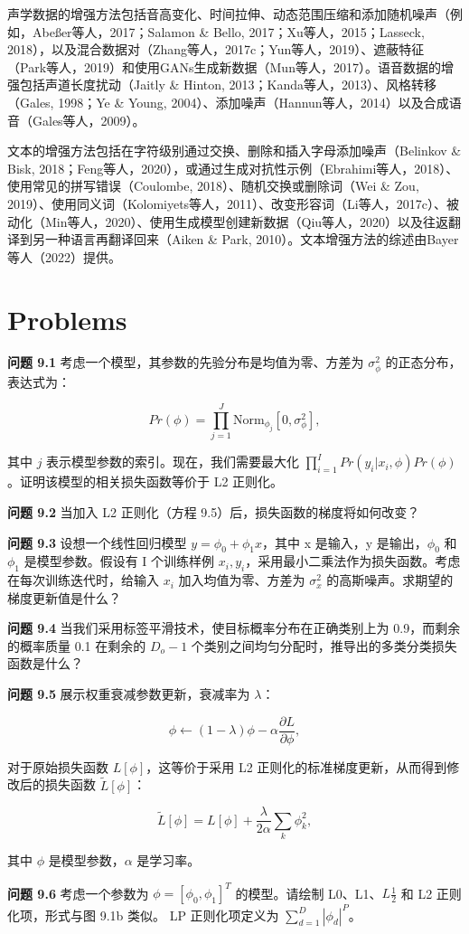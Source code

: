 声学数据的增强方法包括音高变化、时间拉伸、动态范围压缩和添加随机噪声（例如，Abeßer等人，2017；Salamon \& Bello, 2017；Xu等人，2015；Lasseck, 2018），以及混合数据对（Zhang等人，2017c；Yun等人，2019）、遮蔽特征（Park等人，2019）和使用GANs生成新数据（Mun等人，2017）。语音数据的增强包括声道长度扰动（Jaitly \& Hinton, 2013；Kanda等人，2013）、风格转移（Gales, 1998；Ye \& Young, 2004）、添加噪声（Hannun等人，2014）以及合成语音（Gales等人，2009）。

文本的增强方法包括在字符级别通过交换、删除和插入字母添加噪声（Belinkov \& Bisk, 2018；Feng等人，2020），或通过生成对抗性示例（Ebrahimi等人，2018）、使用常见的拼写错误（Coulombe, 2018）、随机交换或删除词（Wei \& Zou, 2019）、使用同义词（Kolomiyets等人，2011）、改变形容词（Li等人，2017c）、被动化（Min等人，2020）、使用生成模型创建新数据（Qiu等人，2020）以及往返翻译到另一种语言再翻译回来（Aiken \& Park, 2010）。文本增强方法的综述由Bayer等人（2022）提供。

\section{Problems}
\textbf{问题 9.1} 考虑一个模型，其参数的先验分布是均值为零、方差为 \(\sigma_{\phi}^2\) 的正态分布，表达式为：

\begin{equation}
Pr(\phi) = \prod_{j=1}^{J} \text{Norm}_{\phi_j} [0, \sigma_{\phi}^2], 
\end{equation}

其中 \( j \) 表示模型参数的索引。现在，我们需要最大化 \(\prod_{i=1}^{I} Pr(y_i|x_i, \phi)Pr(\phi)\)。证明该模型的相关损失函数等价于 L2 正则化。

\textbf{问题 9.2} 当加入 L2 正则化（方程 9.5）后，损失函数的梯度将如何改变？

\textbf{问题 9.3} 设想一个线性回归模型 \(y = \phi_0 + \phi_1 x\)，其中 x 是输入，y  是输出，\(\phi_0\) 和 \(\phi_1\) 是模型参数。假设有 I 个训练样例 \({x_i, y_i}\)，采用最小二乘法作为损失函数。考虑在每次训练迭代时，给输入 \(x_i\) 加入均值为零、方差为 \(\sigma_{x}^2\) 的高斯噪声。求期望的梯度更新值是什么？

\textbf{问题 9.4} 当我们采用标签平滑技术，使目标概率分布在正确类别上为 0.9，而剩余的概率质量 0.1 在剩余的 \(D_o - 1\) 个类别之间均匀分配时，推导出的多类分类损失函数是什么？

\textbf{问题 9.5} 展示权重衰减参数更新，衰减率为 \(\lambda\)：

\begin{equation}
\phi \leftarrow (1 - \lambda) \phi - \alpha \frac{\partial L}{\partial \phi}, 
\end{equation}

对于原始损失函数 \(L[\phi]\)，这等价于采用 L2 正则化的标准梯度更新，从而得到修改后的损失函数 \(\tilde{L}[\phi]\)：

\begin{equation}
\tilde{L}[\phi] = L[\phi] + \frac{\lambda}{2\alpha} \sum_{k} \phi_k^2, 
\end{equation}

其中 \(\phi\) 是模型参数，\(\alpha\) 是学习率。

\textbf{问题 9.6} 考虑一个参数为 \(\phi = [\phi_0, \phi_1]^T\) 的模型。请绘制 L0、L1、\(L\frac{1}{2}\) 和 L2 正则化项，形式与图 9.1b 类似。 LP 正则化项定义为 \(\sum_{d=1}^{D} |\phi_d|^P\)。
